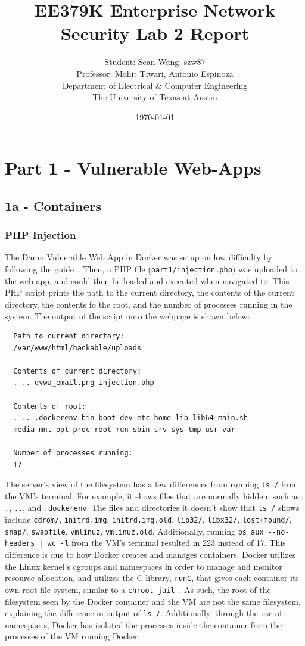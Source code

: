 \documentclass[11pt]{article}
\author{Student: Sean Wang, szw87 \\ Professor: Mohit Tiwari, Antonio Espinoza \\ Department of Electrical \& Computer Engineering \\ The University of Texas at Austin}
\date{\today}
\title{EE379K Enterprise Network Security Lab 2 Report}
\begin{document}
\maketitle
\section*{Part 1 - Vulnerable Web-Apps}
\subsection*{1a - Containers}
\subsubsection*{PHP Injection}
The Damn Vulnerable Web App in Docker was setup on low difficulty by following the guide~\cite{dvwa}. Then, a
PHP file (\verb|part1/injection.php|) was uploaded to the web app, and could then be loaded and executed when navigated to. This PHP script
prints the path to the current directory, the contents of the current directory, the contents fo the root, and the number of processes
running in the system. The output of the script onto the webpage is shown below:
\begin{verbatim}
  Path to current directory:
  /var/www/html/hackable/uploads
  
  Contents of current directory:
  . .. dvwa_email.png injection.php
  
  Contents of root:
  . .. .dockerenv bin boot dev etc home lib lib64 main.sh
  media mnt opt proc root run sbin srv sys tmp usr var
  
  Number of processes running:
  17
\end{verbatim}
The server's view of the filesystem has a few differences from running \verb|ls /| from the VM's terminal. For example, it shows files
that are normally hidden, such as \verb|.|, \verb|..|, and \verb|.dockerenv|. The files and directories it doesn't show that
\verb|ls /| shows include \verb|cdrom/|, \verb|initrd.img|, \verb|initrd.img.old|, \verb|lib32/|, \verb|libx32/|, \verb|lost+found/|,
\verb|snap/|, \verb|swapfile|, \verb|vmlinuz|, \verb|vmlinuz.old|. Additionally, running \verb=ps aux --no-headers | wc -l= from the
VM's terminal resulted in 223 instead of 17. This difference is due to how Docker creates and manages containers. Docker utilizes the
Linux kernel's cgroups and namespaces in order to manage and monitor resource allocation, and utilizes the C library, \verb|runC|,
that gives each container its own root file system, similar to a \verb|chroot jail|~\cite{codementor,demystify}. As such, the root of
the filesystem seen by the Docker container and the VM are not the same filesystem, explaining the difference in output of \verb|ls /|.
Additionally, through the use of namespaces, Docker has isolated the processes inside the container from the processes of the VM
running Docker.
\end{document}
